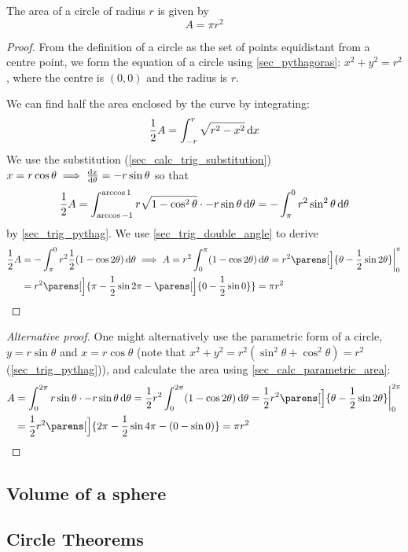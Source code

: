 \begin{theorem}
The area of a circle of radius \(r\) is given by
\begin{equation*}
A = \pi r^2
\end{equation*}
\end{theorem}
\begin{proof}
From the definition of a circle as the set of points equidistant from a
centre point, we form the equation of a circle using \ref{sec_pythagoras}:
\(x^2 + y^2 = r^2\), where the centre is \((0, 0)\) and the radius is \(r\).

We can find half the area enclosed by the curve by integrating:
\begin{equation*}
    \frac 12 A = \integ[-r]<r>{\sqrt{r^2 - x^2}}{x}
\end{equation*}
We use the substitution (\ref{sec_calc_trig_substitution})
\(x = r \cos \theta \implies \dv<x>{\theta} = -r \sin \theta\) so that
\begin{equation*}
    \frac 12 A = \integ[\arccos -1]<\arccos 1>
    {r\sqrt{1 - \cos^2 \theta} \cdot -r \sin \theta}{\theta}
    = -\integ[\pi]<0>{r^2 \sin^2 \theta}{\theta}
\end{equation*}
by \ref{sec_trig_pythag}. We use \ref{sec_trig_double_angle} to derive
\begin{align*}
    \frac 12 A &= -\integ[\pi]<0>
    {r^2 \frac 12 (1 - \cos 2 \theta)}{\theta} \implies
    A = r^2 \integ[0]<\pi>{(1 - \cos 2 \theta)}{\theta} =
    r^2\parens[\Big]{\theta - \frac 12 \sin 2 \theta}\eval_0^\pi \\
    &= r^2 \parens[\Big]{\pi - \frac 12 \sin 2 \pi -
    \parens[\Big]{0 - \frac 12 \sin 0}} = \pi r^2 \qedhere
\end{align*}
\end{proof}
\begin{proof}[Alternative proof]
    One might alternatively use the parametric form of a circle,
    \(y = r \sin \theta\) and \(x = r \cos \theta\)
    (note that \(x^2 + y^2 = r^2(\sin^2 \theta + \cos^2 \theta) = r^2\)
    (\ref{sec_trig_pythag})), and calculate the area using
    \ref{sec_calc_parametric_area}:
    \begin{align*}
        A &= \integ[0]<2\pi>
        {r \sin \theta \cdot -r \sin \theta}{\theta} =
        \frac 12 r^2 \integ[0]<2\pi>{(1 - \cos 2 \theta)}{\theta} =
        \frac 12 r^2 \parens[\Big]{\theta - \frac 12 \sin 2 \theta}\eval_0^{2\pi} \\
        &= \frac 12 r^2 \parens[\Big]{2\pi - \frac 12 \sin 4 \pi -
        (0 - \sin 0)} = \pi r^2 \qedhere
    \end{align*}
\end{proof}

\subsection{Volume of a sphere}

\subsection{Circle Theorems}
